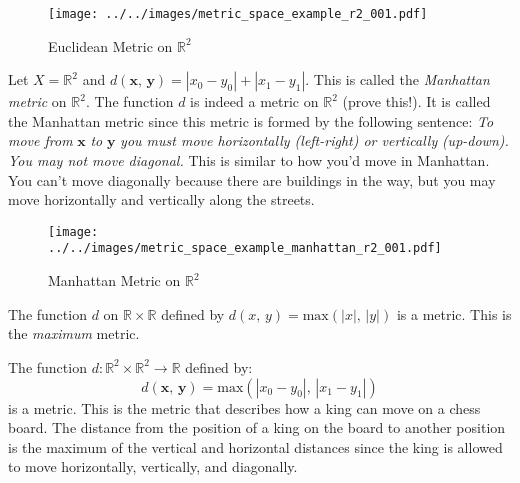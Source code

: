 \documentclass{article}
\theoremstyle{plain}
\theoremstyle{normal}
\newenvironment{example}{%
    \pushQED{\qed}\renewcommand{\qedsymbol}{$\blacksquare$}\examplex%
}{%
    \popQED\endexamplex%
}
\begin{document}
        \begin{figure}
            \centering
            \texttt{[image: ../../images/metric\_space\_example\_r2\_001.pdf]}
            \caption{Euclidean Metric on $\mathbb{R}^{2}$}
            \label{fig:metric_space_example_r2_001}
        \end{figure}
        \begin{example}
            Let $X=\mathbb{R}^{2}$ and
            $d(\mathbf{x},\,\mathbf{y})=|x_{0}-y_{0}|+|x_{1}-y_{1}|$. This is
            called the \textit{Manhattan metric} on $\mathbb{R}^{2}$.
            The function $d$ is indeed a metric on $\mathbb{R}^{2}$
            (prove this!). It is called the Manhattan metric since this metric
            is formed by the following sentence:
            \textit{To move from} $\mathbf{x}$ \textit{to} $\mathbf{y}$
            \textit{you must move horizontally (left-right) or vertically}
            \textit{(up-down). You may not move diagonal.}
            This is similar to how you'd move in Manhattan. You
            can't move diagonally because there are buildings in the way,
            but you may move horizontally and vertically along the streets.
        \end{example}
        \begin{figure}
            \centering
            \texttt{[image: ../../images/metric\_space\_example\_manhattan\_r2\_001.pdf]}
            \caption{Manhattan Metric on $\mathbb{R}^{2}$}
            \label{fig:metric_space_example_manhattan_r2_001}
        \end{figure}
        \begin{example}
            The function $d$ on $\mathbb{R}\times\mathbb{R}$ defined by
            $d(x,\,y)=\textrm{max}(|x|,\,|y|)$ is a metric. This is the
            \textit{maximum} metric.
        \end{example}
        \begin{example}
            The function $d:\mathbb{R}^{2}\times\mathbb{R}^{2}\rightarrow\mathbb{R}$
            defined by:
            \begin{equation}
                d(\mathbf{x},\,\mathbf{y})=
                \textrm{max}(|x_{0}-y_{0}|,\,|x_{1}-y_{1}|)
            \end{equation}
            is a metric. This is the metric that describes how a king can move
            on a chess board. The distance from the position of a king on the
            board to another position is the maximum of the vertical and
            horizontal distances since the king is allowed to move horizontally,
            vertically, and diagonally.
        \end{example}
\end{document}
